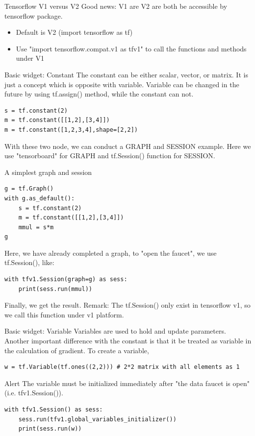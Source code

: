 \documentclass{beamer}
\begin{document}
\begin{frame}[fragile]{Tensorflow V1 versus V2}
Good news: V1 are V2 are both be accessible by tensorflow package.
\begin{itemize}
	\item Default is V2 (import tensorflow as tf)
	\item Use "import tensorflow.compat.v1 as tfv1" to call the functions and methods under V1
\end{itemize}
\end{frame}


\begin{frame}[fragile]{Basic widget: Constant}
The constant can be either scalar, vector, or matrix. It is just a concept which is opposite with variable. Variable can be changed in the future by using tf.assign() method, while the constant can not.
\begin{lstlisting}[style = Python]
s = tf.constant(2)
m = tf.constant([[1,2],[3,4]])
m = tf.constant([1,2,3,4],shape=[2,2])
\end{lstlisting}
With these two node, we can conduct a GRAPH and SESSION example. Here we use "tensorboard" for GRAPH and tf.Session() function for SESSION.
\end{frame}

\begin{frame}[fragile]{A simplest graph and session}
\begin{lstlisting}[style = Python]
g = tf.Graph()
with g.as_default():
    s = tf.constant(2)
    m = tf.constant([[1,2],[3,4]])
    mmul = s*m
g
\end{lstlisting}
Here, we have already completed a graph, to "open the faucet", we use tf.Session(), like:
\begin{lstlisting}[style = Python]
with tfv1.Session(graph=g) as sess:
    print(sess.run(mmul))
\end{lstlisting}
Finally, we get the result. Remark: The tf.Session() only exist in tensorflow v1, so we call this function under v1 platform.
\end{frame}

\begin{frame}[fragile]{Basic widget: Variable}
Variables are used to hold and update parameters. Another important difference with the constant is that it be treated as variable in the calculation of gradient. To create a variable, 
\begin{lstlisting}[style = Python]
w = tf.Variable(tf.ones((2,2))) # 2*2 matrix with all elements as 1
\end{lstlisting}
\begin{alertblock}{Alert}
The variable must be initialized immediately after "the data faucet is open" (i.e. tfv1.Session()).
\end{alertblock}
\begin{lstlisting}[style = Python]
with tfv1.Session() as sess:
    sess.run(tfv1.global_variables_initializer())
    print(sess.run(w))
\end{lstlisting}
\end{frame}
\end{document}
